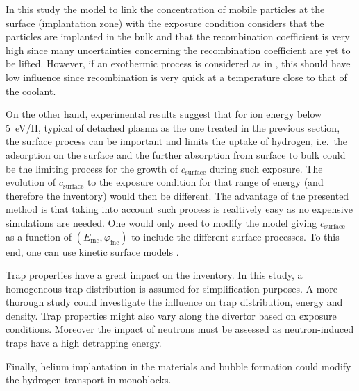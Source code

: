 In this study the model to link the concentration of mobile particles at the surface (implantation zone) with the exposure condition considers that the particles are implanted in the bulk and that the recombination coefficient is very high since many uncertainties concerning the recombination coefficient are yet to be lifted.
However, if an exothermic process is considered as in , this should have low influence since recombination is very quick at a temperature close to that of the coolant.

On the other hand, experimental results  suggest that for ion energy below \SI{5}{eV/H}, typical of detached plasma as the one treated in the previous section, the surface process can be important and limits the uptake of hydrogen, i.e.\ the adsorption on the surface and the further absorption from surface to bulk could be the limiting process for the growth of $c_\mathrm{surface}$ during such exposure.
The evolution of $c_\mathrm{surface}$ to the exposure condition for that range of energy (and therefore the inventory) would then be different.
The advantage of the presented method is that taking into account such process is realtively easy as no expensive simulations are needed.
One would only need to modify the model giving $c_\mathrm{surface}$
as a function of $(E_\mathrm{inc},\varphi_\mathrm{inc})$ to include the different surface processes.
To this end, one can use kinetic surface models .

Trap properties have a great impact on the inventory.
In this study, a homogeneous trap distribution is assumed for simplification purposes.
A more thorough study could investigate the influence on trap distribution, energy and density.
Trap properties might also vary along the divertor based on exposure conditions.
Moreover the impact of neutrons must be assessed as neutron-induced traps have a high detrapping energy.



Finally, helium implantation in the materials and bubble formation could modify the hydrogen transport in monoblocks.

